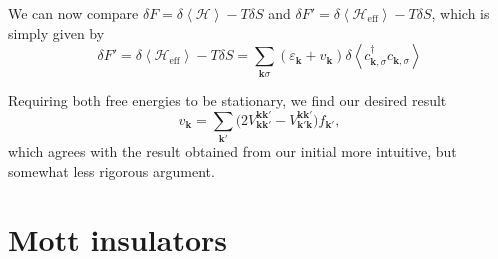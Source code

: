 We can now compare $\delta F = \delta \left\langle \mathcal{H} \right\rangle - T \delta S$ and $\delta F' = \delta \left\langle \mathcal{H}_{\text{eff}} \right\rangle - T \delta S$, which is simply given by
\begin{equation}
\delta F' =  \delta \left\langle \mathcal{H}_{\text{eff}} \right\rangle - T \delta S = \sum_{\bm k \sigma} (\varepsilon_{\bm k} + v_{\bm k}) \delta \left\langle c_{\bm k, \sigma}^\dagger c_{\bm k, \sigma} \right\rangle
\end{equation}

Requiring both free energies to be stationary, we find our desired result
\begin{equation}
v_{\bm k} = \sum_{\bm k'} \bigg( 2 V_{\bm k \bm k'}^{\bm k \bm k'} -  V_{\bm k' \bm k}^{\bm k \bm k'}  \bigg) f_{\bm k'} ,
\end{equation}
which agrees with the result obtained from our initial more intuitive, but somewhat less rigorous  argument.

\section{Mott insulators}\label{sec:mott}

